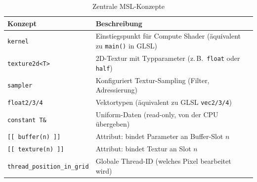 \documentclass[11pt, a4paper]{article}
\newcommand{\tableheadercolor}{\rowcolor{hkared}}
\newcommand{\thw}[1]{\color{white}\textbf{#1}}  %
\begin{document}
\begin{table}[H]
\centering
\small
{}
\begin{tabularx}{\textwidth}{lX}
    \toprule
    \tableheadercolor \thw{Konzept} & \thw{Beschreibung} \\
    \midrule
    \texttt{kernel} & Einstiegspunkt f\"ur Compute Shader (\"aquivalent zu \texttt{main()} in GLSL) \\
    \texttt{texture2d<T>} & 2D-Textur mit Typparameter (z.\,B.\ \texttt{float} oder \texttt{half}) \\
    \texttt{sampler} & Konfiguriert Textur-Sampling (Filter, Adressierung) \\
    \texttt{float2/3/4} & Vektortypen (\"aquivalent zu GLSL \texttt{vec2/3/4}) \\
    \texttt{constant T\&} & Uniform-Daten (read-only, von der CPU \"ubergeben) \\
    \texttt{[[ buffer(n) ]]} & Attribut: bindet Parameter an Buffer-Slot $n$ \\
    \texttt{[[ texture(n) ]]} & Attribut: bindet Textur an Slot $n$ \\
    \texttt{thread\_position\_in\_grid} & Globale Thread-ID (welches Pixel bearbeitet wird) \\
    \bottomrule
\end{tabularx}
\caption{Zentrale MSL-Konzepte}
\end{table}
\newpage \vspace*{-.5cm}
\end{document}
